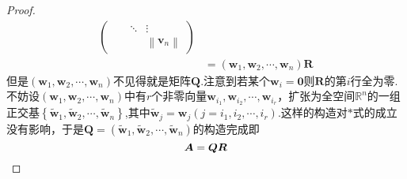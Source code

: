 {\begin{proof}
\begin{align*}
\begin{pmatrix}
                                                       &                                 & \ddots & \vdots                          \\
                                                       &                                 &        & \left\lVert\bm{v}_n\right\rVert
                   \end{pmatrix}\tag{$\ast$} \\
                   & =\left(
            \bm{w}_1,\bm{w}_2,\cdots,\bm{w}_n
            \right)\bm{R}
        \end{align*}但是$\left(
            \bm{w}_1,\bm{w}_2,\cdots,\bm{w}_n
            \right)$不见得就是矩阵$\bm{Q}$.注意到若某个$\bm{w}_i=\bm{0}$则$\bm{R}$的第$i$行全为零.不妨设$\left(
            \bm{w}_1,\bm{w}_2,\cdots,\bm{w}_n
            \right)$中有$r$个非零向量$\bm{w}_{i_1},\bm{w}_{i_2},\cdots,\bm{w}_{i_r}$，扩张为全空间$\mathbb{R}^n$的一组正交基$\left\{
            \widetilde{\bm{w}}_1,\widetilde{\bm{w}}_2,\cdots,\widetilde{\bm{w}}_n
            \right\}$,其中$\widetilde{\bm{w}}_j=\bm{w}_j\left(j=i_1,i_2,\cdots,i_r\right)$.这样的构造对$\ast$式的成立没有影响，于是$\bm{Q}=\left(
            \widetilde{\bm{w}}_1,\widetilde{\bm{w}}_2,\cdots,\widetilde{\bm{w}}_n
            \right)$的构造完成即\[
            \bm{A}=\bm{QR}\qedhere
        \]
    \end{proof}
}